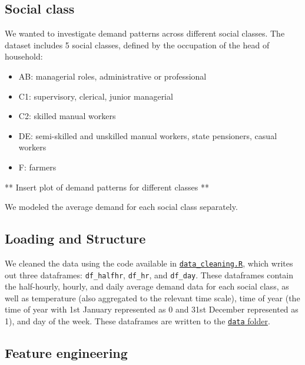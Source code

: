 \documentclass[
]{article}
\providecommand{\tightlist}{%
  \setlength{\itemsep}{0pt}\setlength{\parskip}{0pt}}
\begin{document}
\hypertarget{social-class}{%
\subsection{Social class}\label{social-class}}

We wanted to investigate demand patterns across different social
classes. The dataset includes 5 social classes, defined by the
occupation of the head of household:

\begin{itemize}
\tightlist
\item
  AB: managerial roles, administrative or professional
\item
  C1: supervisory, clerical, junior managerial
\item
  C2: skilled manual workers
\item
  DE: semi-skilled and unskilled manual workers, state pensioners,
  casual workers
\item
  F: farmers
\end{itemize}

** Insert plot of demand patterns for different classes **

We modeled the average demand for each social class separately.

\hypertarget{loading-and-structure}{%
\subsection{Loading and Structure}\label{loading-and-structure}}

We cleaned the data using the code available in
\href{https://github.com/Shermjj/SC-2-Electric-Boogalo/blob/main/data_cleaning.R}{\texttt{data\_cleaning.R}},
which writes out three dataframes: \texttt{df\_halfhr}, \texttt{df\_hr},
and \texttt{df\_day}. These dataframes contain the half-hourly, hourly,
and daily average demand data for each social class, as well as
temperature (also aggregated to the relevant time scale), time of year
(the time of year with 1st January represented as 0 and 31st December
represented as 1), and day of the week. These dataframes are written to
the
\href{https://github.com/Shermjj/SC-2-Electric-Boogalo/tree/main/data}{\texttt{data}
folder}.

\hypertarget{feature-engineering}{%
\subsection{Feature engineering}\label{feature-engineering}}
\end{document}
